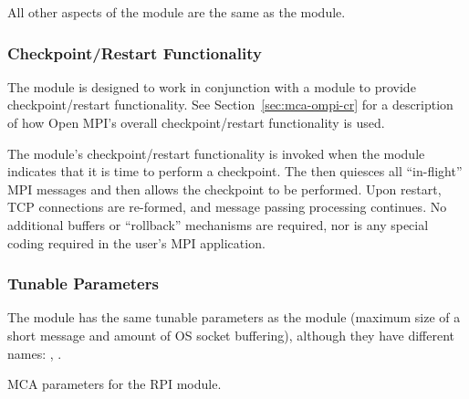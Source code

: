 All other aspects of the  module are the same as the
 module.


\subsubsection{Checkpoint/Restart Functionality}

The  module is designed to work in conjunction with a
 module to provide checkpoint/restart functionality.  See
Section~\ref{sec:mca-ompi-cr} for a description of how Open MPI's overall
checkpoint/restart functionality is used.

The  module's checkpoint/restart functionality is invoked
when the  module indicates that it is time to perform a
checkpoint.  The  then quiesces all ``in-flight'' MPI
messages and then allows the checkpoint to be performed.  Upon
restart, TCP connections are re-formed, and message passing processing
continues.  No additional buffers or ``rollback'' mechanisms are
required, nor is any special coding required in the user's MPI
application.


\subsubsection{Tunable Parameters}


The  module has the same tunable parameters as the
 module (maximum size of a short message and amount of OS
socket buffering), although they have different names:
,
.


\begin{table}[htbp]
  \begin{ssiparamtb}
%
%
%
  \end{ssiparamtb}
  \caption{MCA parameters for the  RPI module.}
  \label{tbl:mca-ompi-crtcp-mca-params}
\end{table}

